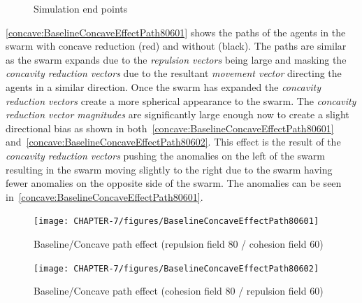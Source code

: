 \begin{figure}[H]
\centering
{}
\caption{Simulation end points}
\label{fig:SimulationEndPoints}
\end{figure} 

\autoref{concave:BaselineConcaveEffectPath80601} shows the paths of the agents in the swarm with concave reduction (red) and without (black). The paths are similar as the swarm expands due to the \textit{repulsion vectors} being large and masking the \textit{concavity reduction vectors} due to the resultant \textit{movement vector} directing the agents in a similar direction. Once the swarm has expanded the \textit{concavity reduction vectors} create a more spherical appearance to the swarm. The \textit{concavity reduction vector magnitudes} are significantly large enough now to create a slight directional bias as shown in both~\autoref{concave:BaselineConcaveEffectPath80601} and~\autoref{concave:BaselineConcaveEffectPath80602}. This effect is the result of the \textit{concavity reduction vectors} pushing the anomalies on the left of the swarm resulting in the swarm moving slightly to the right due to the swarm having fewer anomalies on the opposite side of the swarm. The anomalies can be seen in~\autoref{concave:BaselineConcaveEffectPath80601}.
\begin{figure}[H]
\begin{center}
\texttt{[image: CHAPTER-7/figures/BaselineConcaveEffectPath80601]}
\end{center}
\caption{Baseline/Concave path effect (repulsion field 80 / cohesion field 60)\label{concave:BaselineConcaveEffectPath80601}}
\end{figure}
\begin{figure}[H]
\begin{center}
\texttt{[image: CHAPTER-7/figures/BaselineConcaveEffectPath80602]}
\end{center}
\caption{Baseline/Concave path effect (cohesion field 80 / repulsion field 60)\label{concave:BaselineConcaveEffectPath80602}}
\end{figure}

